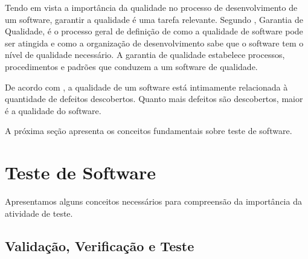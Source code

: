 Tendo em vista a importância da qualidade no processo de desenvolvimento de um software, garantir a qualidade é uma tarefa relevante. Segundo , Garantia de Qualidade, é o processo geral de definição de como a qualidade de software pode ser atingida e como a organização de desenvolvimento sabe que o software tem o nível de qualidade necessário. A garantia de qualidade estabelece processos, procedimentos e padrões que conduzem a um software de qualidade. 

De acordo com , a qualidade de um software está intimamente relacionada à quantidade de defeitos descobertos. Quanto mais defeitos são descobertos, maior é a qualidade do software. %

A próxima seção apresenta os conceitos fundamentais sobre teste de software.


\section{Teste de Software}\label{sec:testesdesoftware}
Apresentamos alguns conceitos necessários para compreensão da importância da atividade de teste.

\subsection{Validação, Verificação e Teste}

